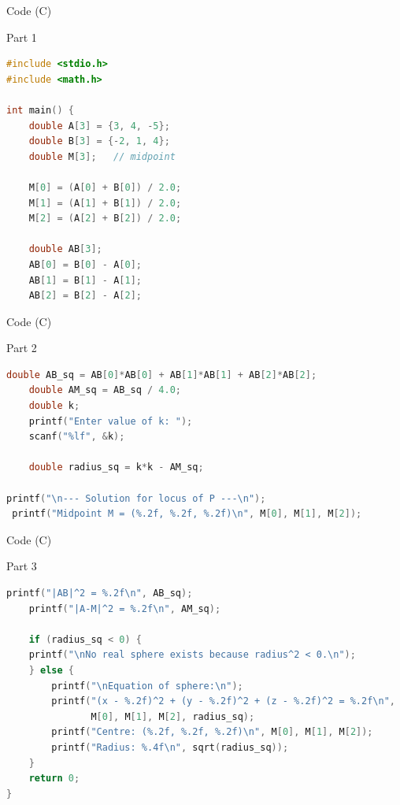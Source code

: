 \documentclass{beamer}
\begin{document}
\begin{frame}[fragile]{ Code (C)}
\begin{block}{Part 1}
\begin{lstlisting}[language=C, basicstyle=\ttfamily\small, keywordstyle=\color{blue}, frame=single]
#include <stdio.h>
#include <math.h>

int main() {
    double A[3] = {3, 4, -5};
    double B[3] = {-2, 1, 4};
    double M[3];   // midpoint

    M[0] = (A[0] + B[0]) / 2.0;
    M[1] = (A[1] + B[1]) / 2.0;
    M[2] = (A[2] + B[2]) / 2.0;

    double AB[3];
    AB[0] = B[0] - A[0];
    AB[1] = B[1] - A[1];
    AB[2] = B[2] - A[2];
\end{lstlisting}
\end{block}
\end{frame}

\begin{frame}[fragile]{ Code (C)}
\begin{block}{Part 2}
\begin{lstlisting}[language=C, basicstyle=\ttfamily\small, keywordstyle=\color{blue}, frame=single]
 double AB_sq = AB[0]*AB[0] + AB[1]*AB[1] + AB[2]*AB[2];
    double AM_sq = AB_sq / 4.0;
    double k;
    printf("Enter value of k: ");
    scanf("%lf", &k);

    double radius_sq = k*k - AM_sq;

printf("\n--- Solution for locus of P ---\n");
 printf("Midpoint M = (%.2f, %.2f, %.2f)\n", M[0], M[1], M[2]);
\end{lstlisting}
\end{block}
\end{frame}

\begin{frame}[fragile]{ Code (C)}
\begin{block}{Part 3}
\begin{lstlisting}[language=C, basicstyle=\ttfamily\small, keywordstyle=\color{blue}, frame=single]
    printf("|AB|^2 = %.2f\n", AB_sq);
    printf("|A-M|^2 = %.2f\n", AM_sq);

    if (radius_sq < 0) {
    printf("\nNo real sphere exists because radius^2 < 0.\n");
    } else {
        printf("\nEquation of sphere:\n");
        printf("(x - %.2f)^2 + (y - %.2f)^2 + (z - %.2f)^2 = %.2f\n",
               M[0], M[1], M[2], radius_sq);
        printf("Centre: (%.2f, %.2f, %.2f)\n", M[0], M[1], M[2]);
        printf("Radius: %.4f\n", sqrt(radius_sq));
    }
    return 0;
}
\end{lstlisting}
\end{block}
\end{frame}
\end{document}
